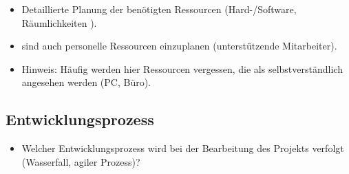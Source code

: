 \begin{itemize}
	\item Detaillierte Planung der benötigten Ressourcen (Hard-/Software, Räumlichkeiten \usw).
	\item \Ggfs sind auch personelle Ressourcen einzuplanen (\zB unterstützende Mitarbeiter).
	\item Hinweis: Häufig werden hier Ressourcen vergessen, die als selbstverständlich angesehen werden (\zB PC, Büro). 
\end{itemize}


\subsection{Entwicklungsprozess}
\label{sec:Entwicklungsprozess}
\begin{itemize}
	\item Welcher Entwicklungsprozess wird bei der Bearbeitung des Projekts verfolgt (\zB Wasserfall, agiler Prozess)?
\end{itemize}

